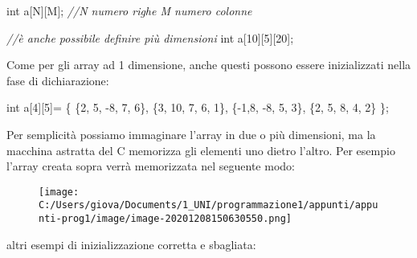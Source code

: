 \documentclass[
]{article}
\newenvironment{Shaded}{}{}
\newcommand{\CommentTok}[1]{\textcolor[rgb]{0.38,0.63,0.69}{\textit{#1}}}
\newcommand{\DataTypeTok}[1]{\textcolor[rgb]{0.56,0.13,0.00}{#1}}
\newcommand{\DecValTok}[1]{\textcolor[rgb]{0.25,0.63,0.44}{#1}}
\newcommand{\NormalTok}[1]{#1}
\begin{document}
\begin{Shaded}
\begin{Highlighting}[]
\DataTypeTok{int}\NormalTok{ a[N][M]; }\CommentTok{//N numero righe M numero colonne}

\CommentTok{//è anche possibile definire più dimensioni}
\DataTypeTok{int}\NormalTok{ a[}\DecValTok{10}\NormalTok{][}\DecValTok{5}\NormalTok{][}\DecValTok{20}\NormalTok{];}
\end{Highlighting}
\end{Shaded}

Come per gli array ad 1 dimensione, anche questi possono essere
inizializzati nella fase di dichiarazione:

\begin{Shaded}
\begin{Highlighting}[]
\DataTypeTok{int}\NormalTok{ a[}\DecValTok{4}\NormalTok{][}\DecValTok{5}\NormalTok{]= \{ \{}\DecValTok{2}\NormalTok{, }\DecValTok{5}\NormalTok{, {-}}\DecValTok{8}\NormalTok{, }\DecValTok{7}\NormalTok{, }\DecValTok{6}\NormalTok{\},}
\NormalTok{                \{}\DecValTok{3}\NormalTok{, }\DecValTok{10}\NormalTok{, }\DecValTok{7}\NormalTok{, }\DecValTok{6}\NormalTok{, }\DecValTok{1}\NormalTok{\},}
\NormalTok{                \{{-}}\DecValTok{1}\NormalTok{,}\DecValTok{8}\NormalTok{, {-}}\DecValTok{8}\NormalTok{, }\DecValTok{5}\NormalTok{, }\DecValTok{3}\NormalTok{\},}
\NormalTok{                \{}\DecValTok{2}\NormalTok{, }\DecValTok{5}\NormalTok{, }\DecValTok{8}\NormalTok{, }\DecValTok{4}\NormalTok{, }\DecValTok{2}\NormalTok{\}}
\NormalTok{			 \};}
\end{Highlighting}
\end{Shaded}

Per semplicità possiamo immaginare l'array in due o più dimensioni, ma
la macchina astratta del C memorizza gli elementi uno dietro l'altro.
Per esempio l'array creata sopra verrà memorizzata nel seguente modo:

\begin{figure}
\centering
\texttt{[image: C:/Users/giova/Documents/1\_UNI/programmazione1/appunti/appunti-prog1/image/image-20201208150630550.png]}
\caption{}
\end{figure}

altri esempi di inizializzazione corretta e sbagliata:
\end{document}
